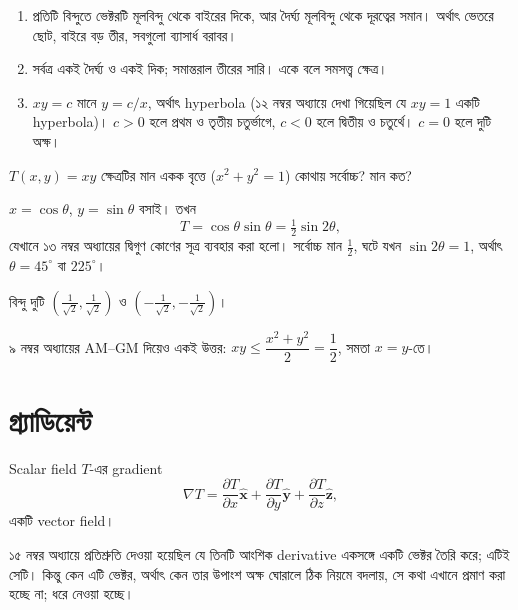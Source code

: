 \documentclass[11pt]{article}
\begin{document}
\begin{sol}
\begin{enumerate}
  \item প্রতিটি বিন্দুতে ভেক্টরটি মূলবিন্দু থেকে বাইরের দিকে, আর দৈর্ঘ্য
        মূলবিন্দু থেকে দূরত্বের সমান। অর্থাৎ ভেতরে ছোট, বাইরে বড় তীর,
        সবগুলো ব্যাসার্ধ বরাবর।
  \item সর্বত্র একই দৈর্ঘ্য ও একই দিক; সমান্তরাল তীরের সারি। একে বলে সমসত্ত্ব
        ক্ষেত্র।
  \item $xy = c$ মানে $y = c/x$, অর্থাৎ hyperbola (১২ নম্বর অধ্যায়ে
        দেখা গিয়েছিল যে $xy = 1$ একটি hyperbola)। $c > 0$ হলে প্রথম ও তৃতীয়
        চতুর্ভাগে, $c<0$ হলে দ্বিতীয় ও চতুর্থে। $c = 0$ হলে দুটি অক্ষ।
\end{enumerate}
\end{sol}

 $T(x,y) = xy$ ক্ষেত্রটির মান একক বৃত্তে ($x^{2}+y^{2}=1$) কোথায়
সর্বোচ্চ? মান কত?

\begin{sol}
$x = \cos\theta$, $y = \sin\theta$ বসাই। তখন
\[
  T = \cos\theta\sin\theta = \tfrac{1}{2}\sin 2\theta ,
\]
যেখানে ১৩ নম্বর অধ্যায়ের দ্বিগুণ কোণের সূত্র ব্যবহার করা হলো। সর্বোচ্চ
মান $\tfrac{1}{2}$, ঘটে যখন $\sin 2\theta = 1$, অর্থাৎ
$\theta = 45^{\circ}$ বা $225^{\circ}$।

বিন্দু দুটি $\left( \tfrac{1}{\sqrt{2}}, \tfrac{1}{\sqrt{2}} \right)$ ও
$\left( -\tfrac{1}{\sqrt{2}}, -\tfrac{1}{\sqrt{2}} \right)$।

৯ নম্বর অধ্যায়ের AM--GM দিয়েও একই উত্তর: $xy \leq
\dfrac{x^{2}+y^{2}}{2} = \dfrac{1}{2}$, সমতা $x=y$-তে।
\end{sol}

\section{গ্র্যাডিয়েন্ট}

\begin{idea}[Gradient]
Scalar field $T$-এর gradient
\[
  \nabla T = \frac{\partial T}{\partial x}\hat{\mathbf{x}}
  + \frac{\partial T}{\partial y}\hat{\mathbf{y}}
  + \frac{\partial T}{\partial z}\hat{\mathbf{z}} ,
\]
একটি vector field।
\end{idea}

১৫ নম্বর অধ্যায়ে প্রতিশ্রুতি দেওয়া হয়েছিল যে তিনটি আংশিক derivative
একসঙ্গে একটি ভেক্টর তৈরি করে; এটিই সেটি। কিন্তু কেন এটি ভেক্টর, অর্থাৎ কেন
তার উপাংশ অক্ষ ঘোরালে ঠিক নিয়মে বদলায়, সে কথা এখানে প্রমাণ করা হচ্ছে না;
ধরে নেওয়া হচ্ছে।
\end{document}
